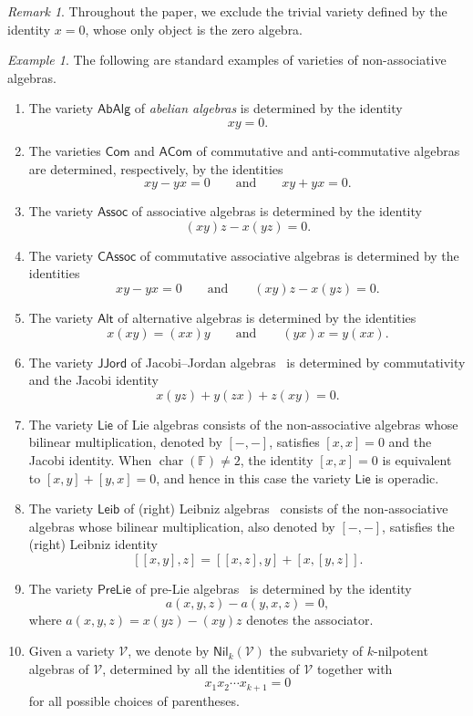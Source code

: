 \documentclass[reqno,a4paper]{amsart}
\theoremstyle{plain}
\theoremstyle{definition}
\theoremstyle{remark}
\newtheorem{remark}[subsection]{Remark}
\newtheorem{example}[subsection]{Example}
\numberwithin{equation}{section}
\newcommand{\F}{\mathbb{F}}
\newcommand{\V}{\mathcal{V}}
\DeclareMathOperator{\bchar}{char}
\newcommand{\Assoc}{\ensuremath{\mathsf{Assoc}}}
\newcommand{\Lie}{\ensuremath{\mathsf{Lie}}}
\newcommand{\PreLie}{\ensuremath{\mathsf{PreLie}}}
\newcommand{\Leib}{\ensuremath{\mathsf{Leib}}}
\newcommand{\CAssoc}{\ensuremath{\mathsf{CAssoc}}}
\newcommand{\Com}{\ensuremath{\mathsf{Com}}}
\newcommand{\ACom}{\ensuremath{\mathsf{ACom}}}
\newcommand{\JJord}{\ensuremath{\mathsf{JJord}}}
\newcommand{\AbAlg}{\ensuremath{\mathsf{AbAlg}}}
\newcommand{\Nil}{\ensuremath{\mathsf{Nil}}}
\newcommand{\Alt}{\ensuremath{\mathsf{Alt}}}
\begin{document}
\begin{remark}
Throughout the paper, we exclude the trivial variety defined by the identity $x=0$, whose only object is the zero algebra.
\end{remark}

\begin{example}\label{ExamplesVarieties}
The following are standard examples of varieties of non-associative algebras.
\begin{enumerate}
\item The variety $\AbAlg$ of \emph{abelian algebras} is determined by the identity
\[
xy=0.
\]

\item The varieties $\Com$ and $\ACom$ of commutative and anti-commutative algebras are determined, respectively, by the identities
\[
xy-yx=0
\qquad\text{and}\qquad
xy+yx=0.
\]

\item The variety $\Assoc$ of associative algebras is determined by the identity
\[
(xy)z-x(yz)=0.
\]

\item The variety $\CAssoc$ of commutative associative algebras is determined by the identities
\[
xy-yx=0 \qquad\text{and}\qquad(xy)z-x(yz)=0.
\]

\item The variety $\Alt$ of alternative algebras is determined by the identities
\[
x(xy)=(xx)y
\qquad\text{and}\qquad
(yx)x=y(xx).
\]

\item The variety $\JJord$ of Jacobi--Jordan algebras~\cite{Burde} is determined by commutativity and the Jacobi identity
\[
x(yz)+y(zx)+z(xy)=0.
\]

\item The variety $\Lie$ of Lie algebras consists of the non-associative algebras whose bilinear multiplication, denoted by $[-,-]$, satisfies $[x,x]=0$ and the Jacobi identity. When $\bchar(\F)\neq2$, the identity $[x,x]=0$ is equivalent to $[x,y]+[y,x]=0$, and hence in this case the variety $\Lie$ is operadic.

\item The variety $\Leib$ of (right) Leibniz algebras~\cite{loday} consists of the non-associative algebras whose bilinear multiplication, also denoted by $[-,-]$, satisfies the (right) Leibniz identity
\[
[[x,y],z]=[[x,z],y]+[x,[y,z]].
\]

\item The variety $\PreLie$ of pre-Lie algebras~\cite{Ger63,Vin63} is determined by the identity
\[
a(x,y,z)-a(y,x,z)=0,
\]
where $a(x,y,z)=x(yz)-(xy)z$ denotes the associator.

\item Given a variety $\V$, we denote by $\Nil_k(\V)$ the subvariety of $k$-nilpotent algebras of $\V$, determined by all the identities of $\V$ together with
\[
x_1 x_2 \cdots x_{k+1}=0
\]
for all possible choices of parentheses.
\end{enumerate}
\end{example}
\end{document}
